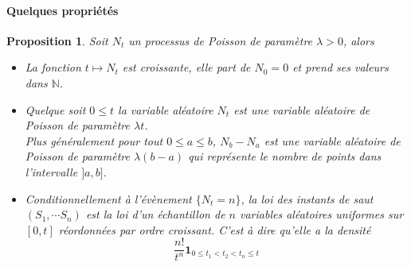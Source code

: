 \documentclass[a4paper,12pt]{book}
\newtheorem{propfr}[thmfr]{Proposition}
\newcommand{\N}{\mathbb{N}}
\begin{document}
\paragraph{Quelques propriétés}
\begin{propfr}
Soit $N_t$ un processus de Poisson de paramètre $\lambda>0$, alors
\begin{itemize}
\item[i)] La fonction $t\mapsto N_t$ est croissante, elle part de $N_0=0$ et prend ses valeurs dans $\N$.
\item[ii)] Quelque soit $0\le  t$ la variable aléatoire $N_t$ est une variable aléatoire de Poisson de paramètre $\lambda t$.\\
Plus généralement pour tout $0\le a\le b$, $N_b-N_a$ est une variable aléatoire de Poisson de paramètre $\lambda (b-a)$ qui représente le nombre de points dans l'intervalle $]a,b]$.
\item[iiii)] Conditionnellement à l'évènement $\{N_t=n\}$, la loi des instants de saut $(S_1, \cdots S_n)$ est la loi d'un échantillon de $n$ variables aléatoires uniformes sur $[0,t]$ réordonnées par ordre croissant. C'est à dire qu'elle a la densité
$$\frac{n!}{t^n}\mathbf{1}_{0\le t_1<t_2<t_n\le t}$$
\end{itemize}
\end{propfr}
\end{document}
